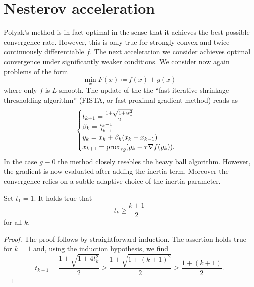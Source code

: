 \section{Nesterov acceleration}
Polyak's method is in fact optimal in the sense that it achieves the best possible convergence rate. However, this is only true for strongly convex and twice continuously differentiable $f$. The next acceleration we consider achieves optimal convergence under significantly weaker conditions. We consider now again problems of the form 
\begin{equation}
    \min_x F(x)\coloneqq f(x) + g(x)
\end{equation}
where only $f$ is $L$-smooth. The update of the the \enquote{fast iterative shrinkage-thresholding algorithm} (FISTA, or fast proximal gradient method) reads as
\begin{equation}
    \begin{cases}
        t_{k+1} = \frac{1+\sqrt{1+4t_k^2}}{2}\\
        \beta_k = \frac{t_k-1}{t_{k+1}}\\
        y_k = x_k + \beta_k(x_k-x_{k-1})\\
        x_{k+1} = \mathrm{prox}_{\tau g}(y_k - \tau \nabla f(y_k)).
    \end{cases}
\end{equation}
In the case $g\equiv 0$ the method closely resebles the heavy ball algorithm. However, the gradient is now evaluated after adding the inertia term. Moreover the convergence relies on a subtle adaptive choice of the inertia parameter.

\begin{lemma}
    Set $t_1 = 1$. It holds true that 
    \begin{equation}
        t_k \geq \frac{k+1}{2}
    \end{equation}
    for all $k$.
\end{lemma}
\begin{proof}
    The proof follows by straightforward induction. The assertion holds true for $k=1$ and, using the induction hypothesis, we find
    \begin{equation}
        t_{k+1} = \frac{1+\sqrt{1+4t_k^2}}{2}\geq \frac{1+\sqrt{1+(k+1)^2}}{2}\geq \frac{1+(k+1)}{2}.
    \end{equation}
\end{proof}

